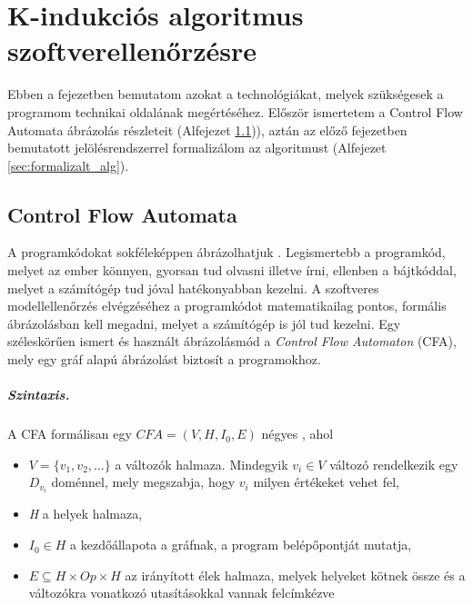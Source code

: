 \chapter{K-indukciós algoritmus szoftverellenőrzésre}

Ebben a fejezetben bemutatom azokat a technológiákat, melyek szükségesek a programom technikai oldalának megértéséhez. Először ismertetem a Control Flow Automata ábrázolás részleteit (Alfejezet \ref{sec:control_flow_automata})), aztán az előző fejezetben bemutatott jelölésrendszerrel formalizálom az algoritmust (Alfejezet \ref{sec:formalizalt_alg}).

\section{Control Flow Automata}
\label{sec:control_flow_automata}

A programkódokat sokféleképpen ábrázolhatjuk \cite{soft_ver_akos}. Legismertebb a programkód, melyet az ember könnyen, gyorsan tud olvasni illetve írni, ellenben a bájtkóddal, melyet a számítógép tud jóval hatékonyabban kezelni. A szoftveres modellellenőrzés elvégzéséhez a programkódot matematikailag pontos, formális ábrázolásban kell megadni, melyet a számítógép is jól tud kezelni. Egy széleskörűen ismert és használt ábrázolásmód a \emph{Control Flow Automaton} (CFA), mely egy gráf alapú ábrázolást biztosít a programokhoz. 

\paragraph{Szintaxis.}
A CFA  formálisan egy $\mathit{CFA} = (V, H, I_0, E)$ négyes \cite{beyer13}, ahol

\begin{itemize}
	\item $V = \{v_1, v_2, \ldots\}$ a változók halmaza. Mindegyik $v_i \in V$ változó rendelkezik egy $D_{v_i}$ doménnel, mely megszabja, hogy $v_i$ milyen értékeket vehet fel,
	\item \emph{H} a helyek halmaza,
	\item $I_0 \in H$ a kezdőállapota a gráfnak, a program belépőpontját mutatja,
	\item $E \subseteq H \times \mathit{Op} \times H$ az irányított élek halmaza, melyek helyeket kötnek össze és a változókra vonatkozó utasításokkal vannak felcímkézve
\end{itemize}


